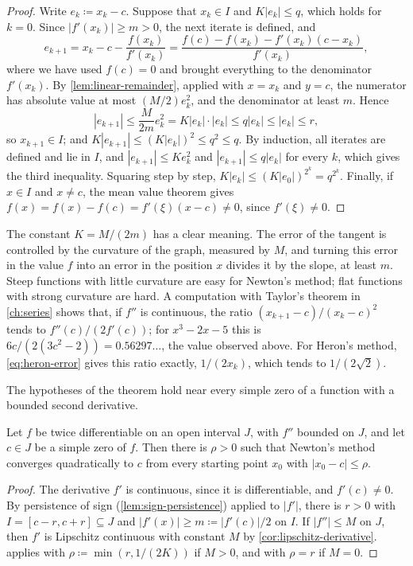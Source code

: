 \begin{proof}
Write $e_k\coloneqq x_k-c$. Suppose that $x_k\in I$ and $K|e_k|\le q$, which holds for $k=0$. Since $|f'(x_k)|\ge m>0$, the next iterate is defined, and
\[
e_{k+1}=x_k-c-\frac{f(x_k)}{f'(x_k)}=\frac{f(c)-f(x_k)-f'(x_k)(c-x_k)}{f'(x_k)},
\]
where we have used $f(c)=0$ and brought everything to the denominator $f'(x_k)$. By \cref{lem:linear-remainder}, applied with $x=x_k$ and $y=c$, the numerator has absolute value at most $(M/2)e_k^2$, and the denominator at least $m$. Hence
\[
|e_{k+1}|\le\frac M{2m}e_k^2=K|e_k|\cdot|e_k|\le q|e_k|\le|e_k|\le r ,
\]
so $x_{k+1}\in I$; and $K|e_{k+1}|\le(K|e_k|)^2\le q^2\le q$. By induction, all iterates are defined and lie in $I$, and $|e_{k+1}|\le Ke_k^2$ and $|e_{k+1}|\le q|e_k|$ for every $k$, which gives the third inequality. Squaring step by step, $K|e_k|\le(K|e_0|)^{2^k}=q^{2^k}$. Finally, if $x\in I$ and $x\ne c$, the mean value theorem gives $f(x)=f(x)-f(c)=f'(\xi)(x-c)\ne0$, since $f'(\xi)\ne0$.
\end{proof}

The constant $K=M/(2m)$ has a clear meaning. The error of the tangent is controlled by the curvature of the graph, measured by $M$, and turning this error in the value $f$ into an error in the position $x$ divides it by the slope, at least $m$. Steep functions with little curvature are easy for Newton's method; flat functions with strong curvature are hard. A computation with Taylor's theorem in \cref{ch:series} shows that, if $f''$ is continuous, the ratio $(x_{k+1}-c)/(x_k-c)^2$ tends to $f''(c)/(2f'(c))$; for $x^3-2x-5$ this is $6c/(2(3c^2-2))=0.56297\ldots$, the value observed above. For Heron's method, \eqref{eq:heron-error} gives this ratio exactly, $1/(2x_k)$, which tends to $1/(2\sqrt2)$.

The hypotheses of the theorem hold near every simple zero of a function with a bounded second derivative.

\begin{corollary}
\label{cor:newton-local}
Let $f$ be twice differentiable on an open interval $J$, with $f''$ bounded on $J$, and let $c\in J$ be a simple zero of $f$. Then there is $\rho>0$ such that Newton's method converges quadratically to $c$ from every starting point $x_0$ with $|x_0-c|\le\rho$.
\end{corollary}

\begin{proof}
The derivative $f'$ is continuous, since it is differentiable, and $f'(c)\ne0$. By persistence of sign (\cref{lem:sign-persistence}) applied to $|f'|$, there is $r>0$ with $I=[c-r,c+r]\subseteq J$ and $|f'(x)|\ge m\coloneqq|f'(c)|/2$ on $I$. If $|f''|\le M$ on $J$, then $f'$ is Lipschitz continuous with constant $M$ by \cref{cor:lipschitz-derivative}.  applies with $\rho\coloneqq\min(r,1/(2K))$ if $M>0$, and with $\rho=r$ if $M=0$.
\end{proof}

